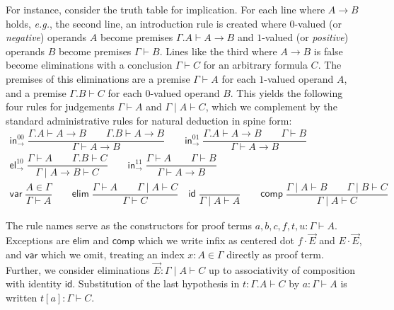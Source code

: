 \documentclass[a4paper]{easychair}
\newcommand{\eg}{\emph{e.g.}\xspace}
\newcommand{\tid}{\mathsf{id}}
\newcommand{\tcomp}{\mathsf{comp}}
\newcommand{\telim}{\mathsf{elim}}
\newcommand{\tvar}{\mathsf{var}}
\newcommand{\nru}[3]{#1\;\dfrac{#2}{#3}}
\newcommand{\tin}{\ensuremath{\mathsf{in}}}
\newcommand{\inn}[2]{\ensuremath{\tin_{#1}^{#2}}}
\newcommand{\tel}{\mathsf{el}}
\newcommand{\el}[2]{\ensuremath{\tel_{#1}^{#2}}}
\begin{document}
\wraptt
For instance, consider the truth table for implication.
For each line where $A \to B$ holds, \eg, the second line, an
introduction rule is created where $0$-valued (or \emph{negative})
operands $A$ become premises $\Gamma.A \vdash A \to B$ and $1$-valued
(or \emph{positive}) operands $B$ become premises $\Gamma \vdash B$.
Lines like the third where $A \to B$ is false become eliminations
with a conclusion $\Gamma \vdash C$ for an arbitrary formula $C$.
The premises of this eliminations are
a premise $\Gamma \vdash A$ for each $1$-valued operand $A$, and
a premise $\Gamma.B \vdash C$ for each $0$-valued operand $B$.
This yields the following four rules for judgements
$\Gamma \vdash A$ and $\Gamma \mid A \vdash C$, which we complement by
the standard administrative rules for natural deduction in spine form:
\begin{gather*}
  \nru{\inn\to{00}
     }{\Gamma.A \vdash A \to B \qquad
       \Gamma.B \vdash A \to B
     }{\Gamma \vdash A \to B
     }
\qquad
  \nru{\inn\to{01}
     }{\Gamma.A \vdash A \to B \qquad
       \Gamma \vdash B
    }{\Gamma \vdash A \to B
    }
\\[2ex]
  \nru{\el\to{10}
     }{\Gamma \vdash A \qquad
       \Gamma.B \vdash C
     }{\Gamma \mid A \to B \vdash C
     }
\qquad
  \nru{\inn\to{11}
     }{\Gamma \vdash A \qquad
       \Gamma \vdash B
     }{\Gamma \vdash A \to B
     }
\\[2ex]
  \nru{\tvar
     }{A \in \Gamma
     }{\Gamma \vdash A}
\qquad
  \nru{\telim
     }{\Gamma \vdash A \qquad
       \Gamma \mid A \vdash C
     }{\Gamma \vdash C}
\quad
  \nru{\tid
     }{
     }{\Gamma \mid A \vdash A}
\qquad
  \nru{\tcomp
     }{\Gamma \mid A \vdash B \qquad
       \Gamma \mid B \vdash C
     }{\Gamma \mid A \vdash C}
\end{gather*}

The rule names serve as the constructors for proof terms $a,b,c,f,t,u : \Gamma
\vdash A$.  Exceptions are
$\telim$ and $\tcomp$ which we write infix as centered dot $f \cdot
\vec E$ and $E \cdot \vec E$, and
$\tvar$ which we omit, treating an index $x : A \in \Gamma$ directly
as proof term.  Further, we consider eliminations $\vec E : \Gamma
\mid A \vdash C$ up to
associativity of composition with identity $\tid$.
Substitution of the last hypothesis in $t : \Gamma.A \vdash C$ by $a :
\Gamma \vdash A$ is written $t[a] : \Gamma \vdash C$.
\end{document}
